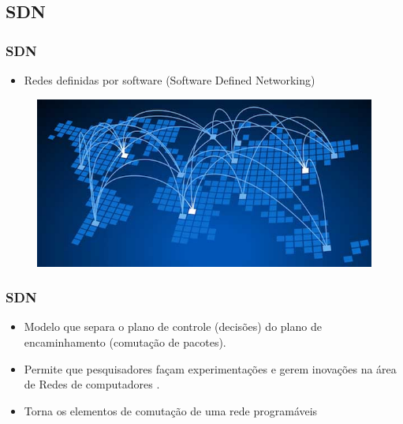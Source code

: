 
\subsection{SDN}

%
%
\begin{frame}\frametitle{SDN}

    \begin{itemize}
        \item Redes definidas por software (Software Defined Networking)
    \end{itemize}

    \begin{figure}[h]
        \centering
        \includegraphics[scale=0.5]{images/sdn.jpg}
    \end{figure}
\end{frame}


%
%
\begin{frame}\frametitle{SDN}

    \begin{itemize}
        \setlength{\itemsep}{1cm}
        \item Modelo que separa o plano de controle (decisões) do plano de 
            encaminhamento (comutação de pacotes). 
        \item Permite que pesquisadores façam experimentações e gerem 
            inovações na área de Redes de computadores 
            \citep{nick2008openflow}.
        \item Torna os elementos de comutação de uma rede programáveis
    \end{itemize}

\end{frame}


